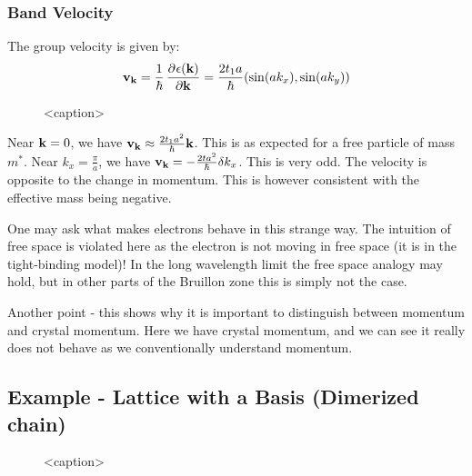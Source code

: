 \subsubsection{Band Velocity}
The group velocity is given by:
\begin{equation}
    \v{v}_\v{k} = \frac{1}{\hbar}\dpd{\e(\v{k})}{\v{k}} = \frac{2t_1a}{\hbar}(\sin(ak_x), \sin(ak_y))
\end{equation}

\begin{figure}[htbp]
    \centering
    
    \caption{<caption>}
    \label{<label>}
\end{figure}

Near $\mathbf{k} = 0$, we have $\mathbf{v}_{\mathbf{k}} \approx \frac{2t_1a^2}{\hbar}\mathbf{k}$. This is as expected for a free particle of mass $m^*$. Near $k_x = \frac{\pi}{a}$, we have $\mathbf{v}_{\mathbf{k}} = -\frac{2ta^2}{\hbar}\delta k_x$. This is very odd. The velocity is opposite to the change in momentum. This is however consistent with the effective mass being negative.

One may ask what makes electrons behave in this strange way. The intuition of free space is violated here as the electron is not moving in free space (it is in the tight-binding model)! In the long wavelength limit the free space analogy may hold, but in other parts of the Bruillon zone this is simply not the case.

Another point - this shows why it is important to distinguish between momentum and crystal momentum. Here we have crystal momentum, and we can see it really does not behave as we conventionally understand momentum.

\subsection{Example - Lattice with a Basis (Dimerized chain)}
\begin{figure}[htbp]
    \centering
    
    \caption{<caption>}
    \label{<label>}
\end{figure}

